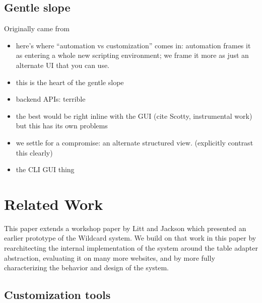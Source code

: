 \documentclass[sigplan,10pt,anonymous,review]{acmart}
\providecommand{\tightlist}{%
  \setlength{\itemsep}{0pt}\setlength{\parskip}{0pt}}
\begin{document}
\hypertarget{gentle-slope}{%
\subsection{Gentle slope}\label{gentle-slope}}

Originally came from \citep{maclean1990}

\begin{itemize}
\tightlist
\item
  here's where ``automation vs customization'' comes in: automation
  frames it as entering a whole new scripting environment; we frame it
  more as just an alternate UI that you can use.
\item
  this is the heart of the gentle slope
\item
  backend APIs: terrible
\item
  the best would be right inline with the GUI (cite Scotty, instrumental
  work) but this has its own problems
\item
  we settle for a compromise: an alternate structured view. (explicitly
  contrast this clearly)
\item
  the CLI GUI thing
\end{itemize}

\hypertarget{sec:related-work}{%
\section{Related Work}\label{sec:related-work}}

This paper extends a workshop paper by Litt and Jackson \citep{litt2020}
which presented an earlier prototype of the Wildcard system. We build on
that work in this paper by rearchitecting the internal implementation of
the system around the table adapter abstraction, evaluating it on many
more websites, and by more fully characterizing the behavior and design
of the system.

\hypertarget{customization-tools}{%
\subsection{Customization tools}\label{customization-tools}}
\end{document}
